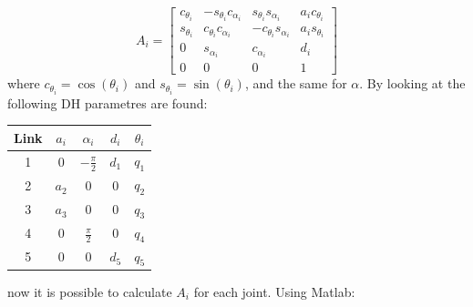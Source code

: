 $$
A_i = 
    \begin{bmatrix}
        c_{\theta_i} & -s_{\theta_i}c_{\alpha_i} & s_{\theta_i}s_{\alpha_i} & a_ic_{\theta_i}\\
        s_{\theta_i} & c_{\theta_i}c_{\alpha_i} & -c_{\theta_i}s_{\alpha_i} & a_is_{\theta_i}\\
        0 & s_{\alpha_i} & c_{\alpha_i} &d_i\\
        0 & 0 & 0 & 1
    \end{bmatrix}
$$
where $c_{\theta_i} = \cos{(\theta_i)}$ and $s_{\theta_i} = \sin{(\theta_i)}$, and the same for $\alpha$. 
By looking at  the following DH parametres are found:
\begin{center}
    \begin{tabular}{|c|c|c|c|c|}
         \hline
         Link & $a_i$ & $\alpha_i$ & $d_i$ & $\theta_i$ \\ \hline
         1 & 0 & $-\frac{\pi}{2}$ & $d_1$ & $q_1$ \\
         2 & $a_2$ & 0 & 0 & $q_2$ \\ 
         3 & $a_3$ & 0 & 0 & $q_3$\\
         4 & 0 & $\frac{\pi}{2}$ & 0 & $q_4$\\
         5 & 0 & 0 & $d_5$ & $q_5$\\
         \hline
    \end{tabular}
\end{center}


now it is possible to calculate $A_i$ for each joint. Using Matlab:

